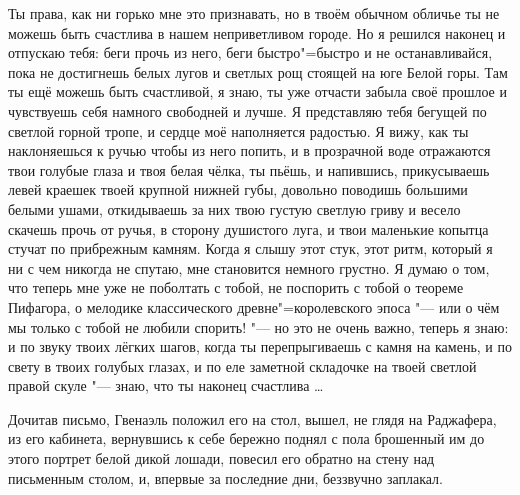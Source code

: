 Ты права, как ни горько мне это признавать, но в твоём обычном обличье ты не
можешь быть счастлива в нашем неприветливом городе.
Но я решился наконец и отпускаю тебя: беги прочь из него, беги быстро"=быстро и
не останавливайся, пока не достигнешь белых лугов и светлых рощ стоящей на юге
Белой горы.
Там ты ещё можешь быть счастливой, я знаю, ты уже отчасти забыла своё прошлое и
чувствуешь себя намного свободней и лучше.
Я представляю тебя бегущей по светлой горной тропе, и сердце моё наполняется
радостью.
Я вижу, как ты наклоняешься к ручью чтобы из него попить, и в прозрачной воде
отражаются твои голубые глаза и твоя белая чёлка, ты пьёшь, и напившись,
прикусываешь левей краешек твоей крупной нижней губы, довольно поводишь большими
белыми ушами, откидываешь за них твою густую светлую гриву и весело скачешь
прочь от ручья, в сторону душистого луга, и твои маленькие копытца стучат по
прибрежным камням.
Когда я слышу этот стук, этот ритм, который я ни с чем никогда не спутаю, мне
становится немного грустно.
Я думаю о том, что теперь мне уже не поболтать с тобой, не поспорить с тобой о
теореме Пифагора, о мелодике классического древне"=королевского эпоса "--- или о
чём мы только с тобой не любили спорить! "--- но это не очень важно, теперь я
знаю: и по звуку твоих лёгких шагов, когда ты перепрыгиваешь с камня на камень,
и по свету в твоих голубых глазах, и по еле заметной складочке на твоей светлой
правой скуле "--- знаю, что ты наконец счастлива \ldots

\medskip
Дочитав письмо, Гвенаэль положил его на стол, вышел, не глядя на Раджафера, из
его кабинета, вернувшись к себе бережно поднял с пола брошенный им до этого
портрет белой дикой лошади, повесил его обратно на стену над письменным столом,
и, впервые за последние дни, беззвучно заплакал.
